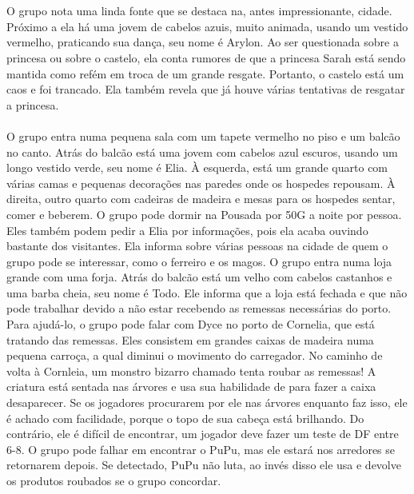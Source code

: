 %
\clearpage
%
\\\\
%
 O grupo nota uma linda fonte que se destaca na, antes impressionante, cidade. 
Próximo a ela há uma jovem de cabelos azuis, muito animada, usando um vestido vermelho, praticando sua dança, seu nome é Arylon.
Ao ser questionada sobre a princesa ou sobre o castelo, ela conta rumores de que a princesa Sarah está sendo mantida como refém em troca de um grande resgate.
Portanto, o castelo está um caos e foi trancado.
Ela também revela que já houve várias tentativas de resgatar a princesa.
%
\vfill
%
\\\\
%
 O grupo entra numa pequena sala com um tapete vermelho no piso e um balcão no canto.
Atrás do balcão está uma jovem com cabelos azul escuros, usando um longo vestido verde, seu nome é Elia.
À esquerda, está um grande quarto com várias camas e pequenas decorações nas paredes onde os hospedes repousam.
À direita, outro quarto com cadeiras de madeira e mesas para os hospedes sentar, comer e beberem.
O grupo pode dormir na Pousada por 50G a noite por pessoa.
Eles também podem pedir a Elia por informações, pois ela acaba ouvindo bastante dos visitantes.
Ela informa sobre várias pessoas na cidade de quem o grupo pode se interessar, como o ferreiro e os magos.
%
\vfill
%
 O grupo entra numa loja grande com uma forja.
Atrás do balcão está um velho com cabelos castanhos e uma barba cheia, seu nome é Todo.
Ele informa que a loja está fechada e que não pode trabalhar devido a não estar recebendo as remessas necessárias do porto. 
Para ajudá-lo, o grupo pode falar com Dyce no porto de Cornelia, que está tratando das remessas.
Eles consistem em grandes caixas de madeira numa pequena carroça, a qual diminui o movimento do carregador.
No caminho de volta à Cornleia, um monstro bizarro chamado  tenta roubar as remessas!
A criatura está sentada nas árvores e usa sua habilidade de  para fazer a caixa desaparecer.
Se os jogadores procurarem por ele nas árvores enquanto faz isso, ele é achado com facilidade, porque o topo de sua cabeça está brilhando.
Do contrário, ele é difícil de encontrar, um jogador deve fazer um teste de DF entre 6-8.
O grupo pode falhar em encontrar o PuPu, mas ele estará nos arredores se retornarem depois. Se detectado, PuPu não luta, ao invés disso ele usa  e devolve os produtos roubados se o grupo concordar.
